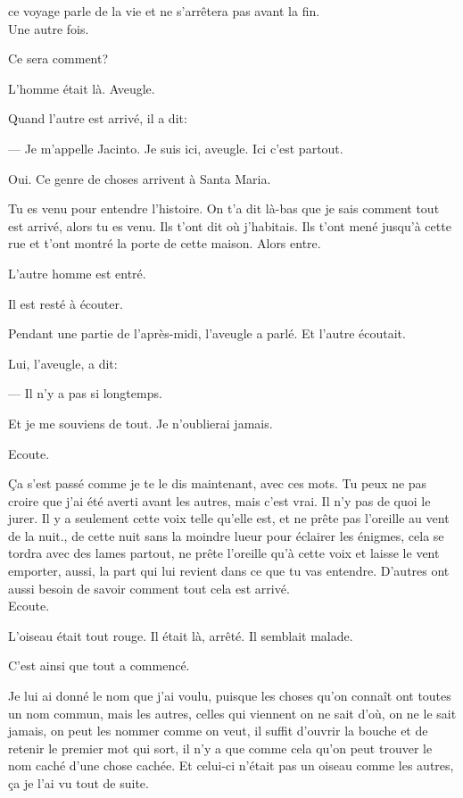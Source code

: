 ce voyage parle de la vie et ne s'arrêtera pas avant la fin.\\

Une autre fois.

Ce sera comment?

\pagebreak

\vspace*{4cm}

L'homme était là. Aveugle.

Quand l'autre est arrivé, il a dit:

--- Je m'appelle Jacinto. Je suis ici, aveugle. Ici c'est partout.

Oui. Ce genre de choses arrivent à Santa Maria.

Tu es venu pour entendre l'histoire. On t'a dit là-bas que je sais
comment tout est arrivé, alors tu es venu. Ils t'ont dit où j'habitais.
Ils t'ont mené jusqu'à cette rue et t'ont montré la porte de cette
maison. Alors entre.

L'autre homme est entré.

Il est resté à écouter.

Pendant une partie de l'après-midi, l'aveugle a parlé. Et l'autre
écoutait.

Lui, l'aveugle, a dit:

--- Il n'y a pas si longtemps.

Et je me souviens de tout. Je n'oublierai jamais.

Ecoute.

Ça s'est passé comme je te le dis maintenant, avec ces mots. Tu peux ne
pas croire que j'ai été averti avant les autres, mais c'est vrai. Il n'y
pas de quoi le jurer. Il y a seulement cette voix telle qu'elle est, et
ne prête pas l'oreille au vent de la nuit., de cette nuit sans la
moindre lueur pour éclairer les énigmes, cela se tordra avec des lames
partout, ne prête l'oreille qu'à cette voix et laisse le vent emporter,
aussi, la part qui lui revient dans ce que tu vas entendre. D'autres ont
aussi besoin de savoir comment tout cela est arrivé.\\

Ecoute.

L'oiseau était tout rouge. Il était là, arrêté. Il semblait malade.

C'est ainsi que tout a commencé.

Je lui ai donné le nom que j'ai voulu, puisque les choses qu'on connaît
ont toutes un nom commun, mais les autres, celles qui viennent on ne
sait d'où, on ne le sait jamais, on peut les nommer comme on veut, il
suffit d'ouvrir la bouche et de retenir le premier mot qui sort, il n'y
a que comme cela qu'on peut trouver le nom caché d'une chose cachée. Et
celui-ci n'était pas un oiseau comme les autres, ça je l'ai vu tout de
suite.\\

